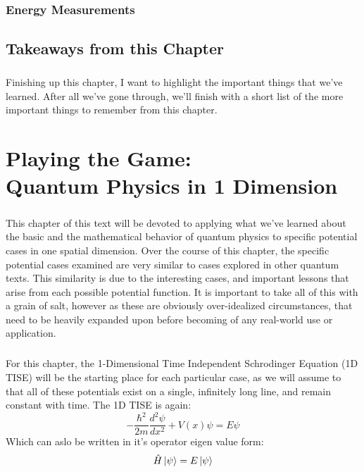 \documentclass[12pt,letterpaper]{book}
\begin{document}

\subsection*{Energy Measurements}


\section{Takeaways from this Chapter}
\paragraph*{}Finishing up this chapter, I want to highlight the important things that we've learned. After all we've gone through, we'll finish with a short list of the more important things to remember from this chapter.


\chapter{Playing the Game: \\ Quantum Physics in 1 Dimension}


\paragraph*{}This chapter of this text will be devoted to applying what we've learned about the basic and the mathematical behavior of quantum physics to specific potential cases in one spatial dimension. Over the course of this chapter, the specific potential cases examined are very similar to cases explored in other quantum texts. This similarity is due to the interesting cases, and important lessons that arise from each possible potential function. It is important to take all of this with a grain of salt, however as these are obviously over-idealized circumstances, that need to be heavily expanded upon before becoming of any real-world use or application.
\paragraph*{}For this chapter, the 1-Dimensional Time Independent Schrodinger Equation (1D TISE) will be the starting place for each particular case, as we will assume to that all of these potentials exist on a single, infinitely long line, and remain constant with time. The 1D TISE is again:
\begin{equation}
\label{1D TISE}
-\frac{\hbar^2}{2m}\frac{d^2 \psi}{dx^2} + V(x)\psi = E\psi
\end{equation}
Which can aslo be written in it's operator eigen value form:
\begin{equation}
\label{1D TISE Eigen}
\hat{H}\ket{\psi} = E\ket{\psi}
\end{equation}
\end{document}
